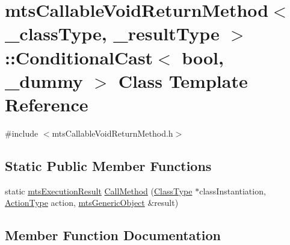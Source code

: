 \hypertarget{classmts_callable_void_return_method_1_1_conditional_cast}{}\section{mts\+Callable\+Void\+Return\+Method$<$ \+\_\+class\+Type, \+\_\+result\+Type $>$\+:\+:Conditional\+Cast$<$ bool, \+\_\+dummy $>$ Class Template Reference}
\label{classmts_callable_void_return_method_1_1_conditional_cast}


{\ttfamily \#include $<$mts\+Callable\+Void\+Return\+Method.\+h$>$}

\subsection*{Static Public Member Functions}
\begin{DoxyCompactItemize}
\item 
static \hyperlink{classmts_execution_result}{mts\+Execution\+Result} \hyperlink{classmts_callable_void_return_method_1_1_conditional_cast_a3b9e211ba1cf2392b29f29244fbeb95b}{Call\+Method} (\hyperlink{classmts_callable_void_return_method_a2bea77e5dd239ec2a1d3558dd3ca1776}{Class\+Type} $\ast$class\+Instantiation, \hyperlink{classmts_callable_void_return_method_a8fcdd120f008efea73b3d51cbb34f773}{Action\+Type} action, \hyperlink{classmts_generic_object}{mts\+Generic\+Object} \&result)
\end{DoxyCompactItemize}


\subsection{Member Function Documentation}
\hypertarget{classmts_callable_void_return_method_1_1_conditional_cast_a3b9e211ba1cf2392b29f29244fbeb95b}{}
